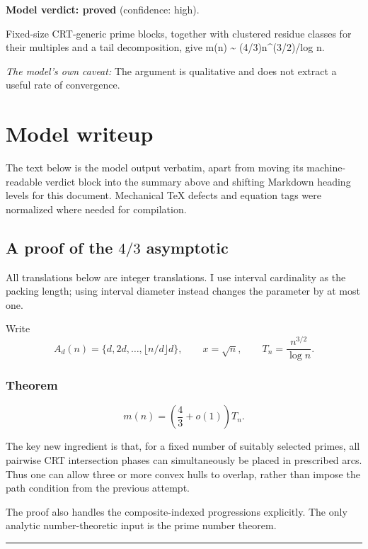 \documentclass[
  11pt,
  a4paper,
]{article}
\begin{document}
\textbf{Model verdict: proved} (confidence: high).

Fixed-size CRT-generic prime blocks, together with clustered residue
classes for their multiples and a tail decomposition, give m(n)
\textasciitilde{} (4/3)n\^{}(3/2)/log n.

\emph{The model's own caveat:} The argument is qualitative and does not
extract a useful rate of convergence.

\section{Model writeup}\label{model-writeup}

The text below is the model output verbatim, apart from moving its
machine-readable verdict block into the summary above and shifting
Markdown heading levels for this document. Mechanical TeX defects and
equation tags were normalized where needed for compilation.

\subsection{\texorpdfstring{A proof of the \(4/3\)
asymptotic}{A proof of the 4/3 asymptotic}}\label{a-proof-of-the-43-asymptotic}

All translations below are integer translations. I use interval
cardinality as the packing length; using interval diameter instead
changes the parameter by at most one.

Write \[
A_d(n)=\{d,2d,\ldots,\lfloor n/d\rfloor d\},
\qquad
x=\sqrt n,
\qquad
T_n=\frac{n^{3/2}}{\log n}.
\]

\subsubsection{Theorem}\label{theorem}

\[
m(n)=\left(\frac43+o(1)\right)T_n.
\]

The key new ingredient is that, for a fixed number of suitably selected
primes, all pairwise CRT intersection phases can simultaneously be
placed in prescribed arcs. Thus one can allow three or more convex hulls
to overlap, rather than impose the path condition from the previous
attempt.

The proof also handles the composite-indexed progressions explicitly.
The only analytic number-theoretic input is the prime number theorem.

\begin{center}\rule{0.5\linewidth}{0.5pt}\end{center}
\end{document}
